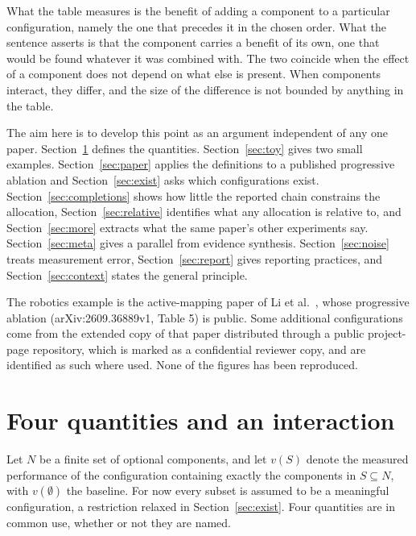 \documentclass[11pt]{article}
\theoremstyle{plain}
\theoremstyle{remark}
\begin{document}
What the table measures is the benefit of adding a component to a particular configuration, namely the one that precedes it in the chosen order. What the sentence asserts is that the component carries a benefit of its own, one that would be found whatever it was combined with. The two coincide when the effect of a component does not depend on what else is present. When components interact, they differ, and the size of the difference is not bounded by anything in the table.

The aim here is to develop this point as an argument independent of any one paper. Section~\ref{sec:quantities} defines the quantities. Section~\ref{sec:toy} gives two small examples. Section~\ref{sec:paper} applies the definitions to a published progressive ablation and Section~\ref{sec:exist} asks which configurations exist. Section~\ref{sec:completions} shows how little the reported chain constrains the allocation, Section~\ref{sec:relative} identifies what any allocation is relative to, and Section~\ref{sec:more} extracts what the same paper's other experiments say. Section~\ref{sec:meta} gives a parallel from evidence synthesis. Section~\ref{sec:noise} treats measurement error, Section~\ref{sec:report} gives reporting practices, and Section~\ref{sec:context} states the general principle.

The robotics example is the active-mapping paper of Li et al.~\cite{li2026roads}, whose progressive ablation (arXiv:2609.36889v1, Table 5) is public. Some additional configurations come from the extended copy of that paper distributed through a public project-page repository, which is marked as a confidential reviewer copy, and are identified as such where used. None of the figures has been reproduced.

\section{Four quantities and an interaction}\label{sec:quantities}

Let $N$ be a finite set of optional components, and let $v(S)$ denote the measured performance of the configuration containing exactly the components in $S\subseteq N$, with $v(\emptyset)$ the baseline. For now every subset is assumed to be a meaningful configuration, a restriction relaxed in Section~\ref{sec:exist}. Four quantities are in common use, whether or not they are named.
\end{document}
